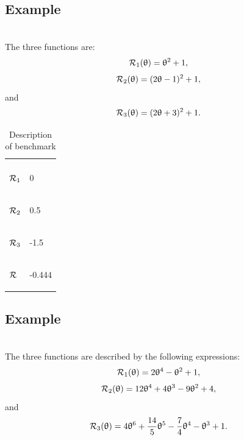 \documentclass[article,authoryear,jmlmc]{beg_32}             %
\begin{document}
\subsection{Example \exFive}
~~\\
The three functions are:
\begin{equation*}
	\mathcal{R}_1(\uptheta) = \uptheta^2+1,
\end{equation*}
\begin{equation*}
	\mathcal{R}_2(\uptheta) = (2\uptheta-1)^2+1,
\end{equation*}
and
\begin{equation*}
	\mathcal{R}_3(\uptheta) = (2\uptheta+3)^2+1.
\end{equation*}

\begin{table}[h!]
	\centering
	\caption{Description of benchmark \exFive}
	\begin{tabular}{ll}
		
		\begin{bf} \diagbox{Functions}{Minima} \end{bf} & \begin{bf}\mg\end{bf} \\ 
		
		\begin{bf}$\mathcal{R}_1$\end{bf} & 0 \\ 
		\begin{bf}$\mathcal{R}_2$\end{bf} & 0.5  \\ 
		\begin{bf}$\mathcal{R}_3$\end{bf} & -1.5  \\ 
		\begin{bf}$\mathcal{R}$\end{bf}   & -0.444  \\ 
	\end{tabular}
	\label{ex5_example}
\end{table}

\subsection{Example \exSix}
~~\\
The three functions are described by the following expressions:
\begin{equation*}
	\mathcal{R}_1(\uptheta) = 2\uptheta^4-\uptheta^2+1,
\end{equation*}
\begin{equation*}
	\mathcal{R}_2(\uptheta) = 12\uptheta^4+4\uptheta^3-9\uptheta^2+4,
\end{equation*}
and
\begin{equation*}
	\mathcal{R}_3(\uptheta) = 4\uptheta^6+\frac{14}{5}\uptheta^5-\frac{7}{4}\uptheta^4-\uptheta^3+1.
\end{equation*}
\end{document}
